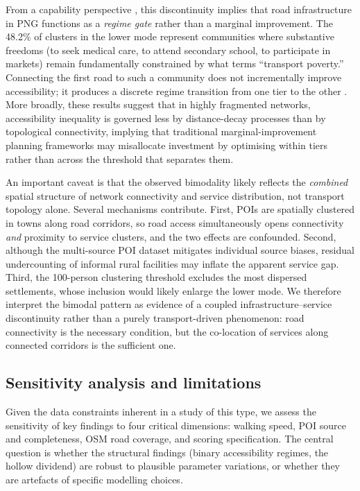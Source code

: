 \documentclass[review,3p,authoryear]{elsarticle}
\begin{document}
From a capability perspective \citep{sen1999}, this discontinuity implies that road infrastructure in PNG functions as a \textit{regime gate} rather than a marginal improvement. The 48.2\% of clusters in the lower mode represent communities where substantive freedoms (to seek medical care, to attend secondary school, to participate in markets) remain fundamentally constrained by what \citet{lucas2012} terms ``transport poverty.'' Connecting the first road to such a community does not incrementally improve accessibility; it produces a discrete regime transition from one tier to the other \citep{lucas2016}. More broadly, these results suggest that in highly fragmented networks, accessibility inequality is governed less by distance-decay processes than by topological connectivity, implying that traditional marginal-improvement planning frameworks may misallocate investment by optimising within tiers rather than across the threshold that separates them.

An important caveat is that the observed bimodality likely reflects the \textit{combined} spatial structure of network connectivity and service distribution, not transport topology alone. Several mechanisms contribute. First, POIs are spatially clustered in towns along road corridors, so road access simultaneously opens connectivity \textit{and} proximity to service clusters, and the two effects are confounded. Second, although the multi-source POI dataset mitigates individual source biases, residual undercounting of informal rural facilities may inflate the apparent service gap. Third, the 100-person clustering threshold excludes the most dispersed settlements, whose inclusion would likely enlarge the lower mode. We therefore interpret the bimodal pattern as evidence of a coupled infrastructure--service discontinuity rather than a purely transport-driven phenomenon: road connectivity is the necessary condition, but the co-location of services along connected corridors is the sufficient one.

\subsection{Sensitivity analysis and limitations}
\label{sec:sensitivity}

Given the data constraints inherent in a study of this type, we assess the sensitivity of key findings to four critical dimensions: walking speed, POI source and completeness, OSM road coverage, and scoring specification. The central question is whether the structural findings (binary accessibility regimes, the hollow dividend) are robust to plausible parameter variations, or whether they are artefacts of specific modelling choices.
\end{document}
